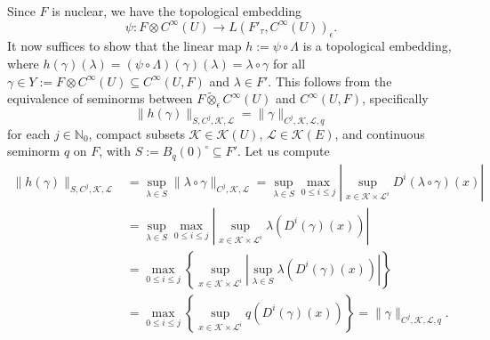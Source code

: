 \documentclass[11pt,reqno]{amsart}
\theoremstyle{definition}
\numberwithin{equation}{section}
\begin{document}
Since $F$ is nuclear, we have the topological embedding
\[
\psi : F \otimes C^{\infty}(U) \rightarrow L(F'_{\tau}, C^{\infty}(U))_{\epsilon}.
\]
It now suffices to show that the linear map $h := \psi \circ \Lambda$ is a topological embedding, where $h(\gamma)(\lambda) = (\psi \circ \Lambda)(\gamma)(\lambda) = \lambda \circ \gamma$ for all $\gamma \in Y := F \otimes C^{\infty}(U) \subseteq C^{\infty}(U, F)$ and $\lambda \in F'$. This follows from the equivalence of seminorms between $F \tilde{\otimes}_{\epsilon} C^{\infty}(U)$ and $C^{\infty}(U, F)$, specifically
\[
\|h(\gamma)\|_{S, C^j, \mathcal{K}, \mathcal{L}} = \|\gamma\|_{C^j, \mathcal{K}, \mathcal{L}, q}
\]
for each $j \in \mathbb{N}_0$, compact subsets $\mathcal{K} \in \mathcal{K}(U)$, $\mathcal{L} \in \mathcal{K}(E)$, and continuous seminorm $q$ on $F$, with $S := B_q(0)^{\circ} \subseteq F'$. Let us compute
\begin{align*}
\|h(\gamma)\|_{S, C^j, \mathcal{K}, \mathcal{L}} &= \sup_{\lambda \in S} \|\lambda \circ \gamma\|_{C^j, \mathcal{K}, \mathcal{L}} = \sup_{\lambda \in S} \max_{0 \le i \le j} \left| \sup_{x \in \mathcal{K} \times \mathcal{L}^i} D^i(\lambda \circ \gamma)(x) \right| \\
&= \sup_{\lambda \in S} \max_{0 \le i \le j} \left| \sup_{x \in \mathcal{K} \times \mathcal{L}^i} \lambda(D^i(\gamma)(x)) \right| \\
&= \max_{0 \le i \le j} \left\{ \sup_{x \in \mathcal{K} \times \mathcal{L}^i} \left| \sup_{\lambda \in S} \lambda(D^i(\gamma)(x)) \right| \right\} \\
&= \max_{0 \le i \le j} \left\{ \sup_{x \in \mathcal{K} \times \mathcal{L}^i} q(D^i(\gamma)(x)) \right\} = \|\gamma\|_{C^j, \mathcal{K}, \mathcal{L}, q}.
\end{align*}
\end{document}

